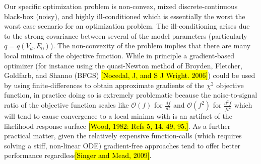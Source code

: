 \documentclass[10pt,a4paper]{article}
\begin{document}
Our specific optimization problem is non-convex, mixed discrete-continuous black-box (noisy), and highly ill-conditioned which is essentially the worst the worst case scenario for an optimization problem. The ill-conditioning arises due to the strong covariance between several of the model parameters (particularly $q=q(V_d, E_0)$). The non-convexity of the problem implies that there are many local minima of the objective function. While in principle a gradient-based optimizer (for instance using the quasi-Newton method of Broyden, Fletcher, Goldfarb, and Shanno (BFGS) \hl{[Nocedal, J, and S J Wright. 2006]}) could be used by using finite-differences to obtain approximate gradients of the $\chi^2$ objective function, in practice doing so is extremely problematic because the noise-to-signal ratio of the objective function scales like $\mathcal{O}(f)$ for $\frac{df}{dt}$ and $\mathcal{O}(f^2)$ for $\frac{d^2f}{ft^2}$ which will tend to cause convergence to a local minima with is an artifact of the likelihood response surface \hl{[Wood, 1982: Refs 5, 14, 49, 95.]}. As a further practical matter, given the relatively expensive function-calls (which requires solving a stiff, non-linear ODE) gradient-free approaches tend to offer better performance regardless\hl{[Singer and Mead, 2009]}.  
\end{document}
